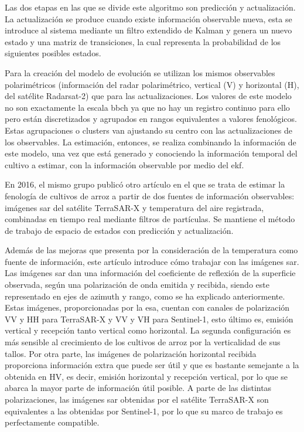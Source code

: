 \par Las dos etapas en las que se divide este algoritmo son predicción y actualización. La actualización se produce cuando existe información observable nueva, esta se introduce al sistema mediante un filtro extendido de Kalman y genera un nuevo estado y una matriz de transiciones, la cual representa la probabilidad de los siguientes posibles estados.
\\
\par Para la creación del modelo de evolución se utilizan los mismos observables polarimétricos (información del radar polarimétrico, vertical (V) y horizontal (H), del satélite Radarsat-2) que para las actualizaciones. Los valores de este modelo no son exactamente la escala \gls{bbch} ya que no hay un registro continuo para ello pero están discretizados y agrupados en rangos equivalentes a valores fenológicos. Estas agrupaciones o clusters van ajustando su centro con las actualizaciones de los observables. La estimación, entonces, se realiza combinando la información de este modelo, una vez que está generado y conociendo la información temporal del cultivo a estimar, con la información observable por medio del \gls{ekf}.
\\
\par En 2016, el mismo grupo publicó otro artículo \cite{Juanma2016} en el que se trata de estimar la fenología de cultivos de arroz a partir de dos fuentes de información observables: imágenes \gls{sar} del satélite TerraSAR-X y temperatura del aire registrada, combinadas en tiempo real mediante filtros de partículas. Se mantiene el método de trabajo de espacio de estados con predicción y actualización. 
\\
\par Además de las mejoras que presenta por la consideración de la temperatura como fuente de información, este artículo introduce cómo trabajar con las imágenes \gls{sar}. Las imágenes \gls{sar} dan una información del coeficiente de reflexión de la superficie observada, según una polarización de onda emitida y recibida, siendo este representado en ejes de azimuth y rango, como se ha explicado anteriormente. Estas imágenes, proporcionadas por la \gls{esa}, cuentan con canales de polarización VV y HH para TerraSAR-X y VV y VH para Sentinel-1, esto último es, emisión vertical y recepción tanto vertical como horizontal. La segunda configuración es más sensible al crecimiento de los cultivos de arroz por la verticalidad de sus tallos. Por otra parte, las imágenes de polarización horizontal recibida proporciona información extra que puede ser útil y que es bastante semejante a la obtenida en HV, es decir, emisión horizontal y recepción vertical, por lo que se abarca la mayor parte de información útil posible. A parte de las distintas polarizaciones, las imágenes \gls{sar} obtenidas por el satélite TerraSAR-X son equivalentes a las obtenidas por Sentinel-1, por lo que su marco de trabajo es perfectamente compatible. 


